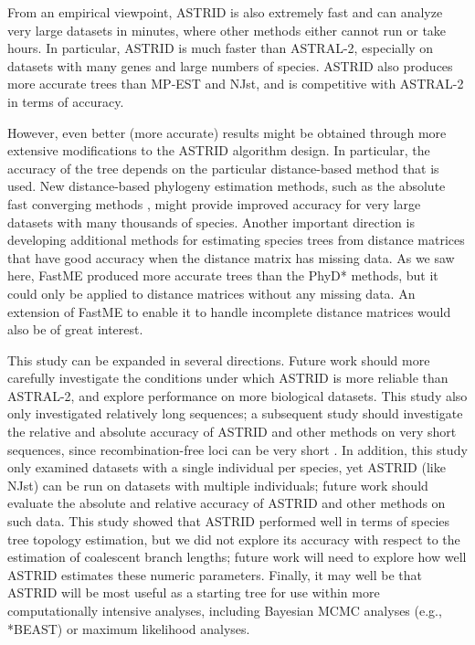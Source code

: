 From an empirical viewpoint, ASTRID is also extremely fast and can
analyze very large datasets in minutes, where other methods either
cannot run or take hours.  In particular, ASTRID is much faster than
ASTRAL-2, 
 especially on datasets with many genes and large numbers of
species.  ASTRID also produces more accurate trees than MP-EST and
NJst, and is competitive with ASTRAL-2 
 in terms of accuracy.

However, even better (more accurate) results might be obtained through
more extensive modifications to the ASTRID algorithm design. In
particular, the accuracy of the tree depends on the particular
distance-based method that is used. 
New distance-based phylogeny estimation methods, such as
the absolute fast converging methods 
\cite{afc,roch-science}, might provide 
improved accuracy for very large datasets with many thousands of 
species.
Another important direction is developing additional methods 
for estimating species trees from distance matrices that have good
accuracy when the distance matrix has missing data. As we saw here,
FastME produced more accurate trees than the PhyD* methods, but it
could only be applied to distance matrices without any missing data.
An extension of FastME to enable it to handle incomplete distance matrices
would also be of great interest.


This study can be expanded in several directions.
Future work should more carefully investigate the conditions 
under which ASTRID is more reliable than ASTRAL-2, and explore
performance on more biological datasets. 
This study also only investigated relatively
long sequences; a subsequent study should investigate 
the relative and absolute accuracy of ASTRID and other methods
on very short sequences, since
recombination-free loci can be very short \cite{GatesyMPE2014}.
In addition, this study only examined datasets with a single
individual per species, yet ASTRID 
(like NJst)
can be run on datasets with multiple individuals;
future work should  
evaluate the absolute and relative accuracy of ASTRID and other methods
on such data.
This study showed that  ASTRID performed well in terms of species tree topology estimation, but 
we did not explore its accuracy with respect to the estimation of 
coalescent branch lengths; future work will need to explore how well
ASTRID estimates
these numeric parameters.
Finally, it may well be that ASTRID will be most useful as
a starting tree for use within more 
computationally intensive analyses, including
Bayesian MCMC analyses (e.g., *BEAST) or
maximum likelihood analyses.
